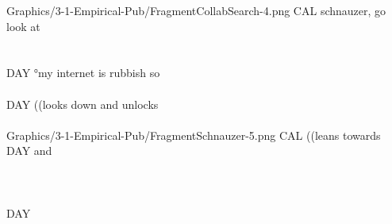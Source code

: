 \begin{inlinefrag*}
\begin{transcript*}
           {Graphics/3-1-Empirical-Pub/FragmentCollabSearch-4.png}
        \by CAL {schnauzer, go look at} \\
         \\
        \\
        \by DAY {°my internet is rubbish so} \\
         \\
                \by DAY {((looks down and unlocks} \\
         \\
           {Graphics/3-1-Empirical-Pub/FragmentSchnauzer-5.png} 
        \by CAL {((leans towards DAY and} \\
         \\
         \\
         \\
        \by DAY {\vspace*{1.6cm}}
    \end{transcript*}
\end{inlinefrag*}





